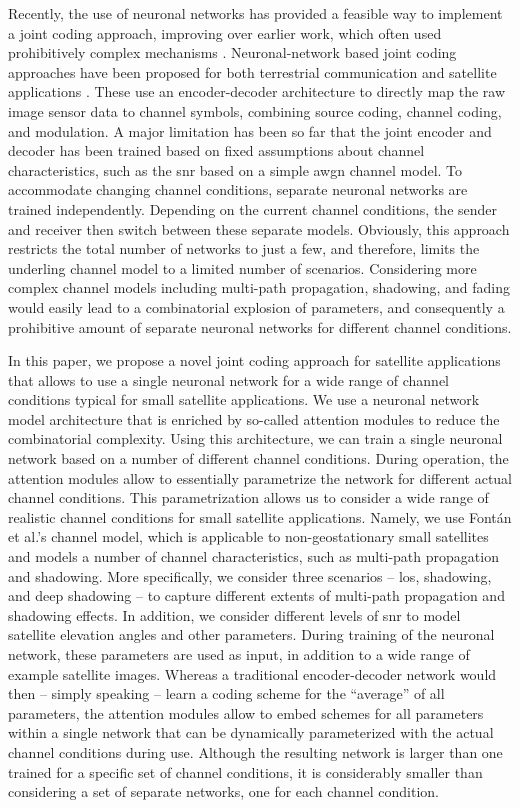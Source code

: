 \documentclass[conference]{IEEEtran}
\begin{document}
Recently, the use of neuronal networks has provided a feasible way to implement a joint coding approach, improving over earlier work, which often used prohibitively complex mechanisms \cite{9838671}.
Neuronal-network based joint coding approaches have been proposed for both terrestrial communication \cite{Bourtsoulatze2019} and satellite applications \cite{satjscc}.
These use an encoder-decoder architecture to directly map the raw image sensor data to channel symbols, combining source coding, channel coding, and modulation.
A major limitation has been so far that the joint encoder and decoder has been trained based on fixed assumptions about channel characteristics, such as the \ac{snr} based on a simple \ac{awgn} channel model.
To accommodate changing channel conditions, separate neuronal networks are trained independently.
Depending on the current channel conditions, the sender and receiver then switch between these separate models.
Obviously, this approach restricts the total number of networks to just a few, and therefore, limits the underling channel model to a limited number of scenarios.
Considering more complex channel models including multi-path propagation, shadowing, and fading would easily lead to a combinatorial explosion of parameters, and consequently a prohibitive amount of separate neuronal networks for different channel conditions.

In this paper, we propose a novel joint coding approach for satellite applications that allows to use a single neuronal network for a wide range of channel conditions typical for small satellite applications.
We use a neuronal network model architecture that is enriched by so-called attention modules to reduce the combinatorial complexity.
Using this architecture, we can train a single neuronal network based on a number of different channel conditions.
During operation, the attention modules allow to essentially parametrize the network for different actual channel conditions.
This parametrization allows us to consider a wide range of realistic channel conditions for small satellite applications.
Namely, we use Fontán et al.'s channel model, which is applicable to non-geostationary small satellites and models a number of channel characteristics, such as multi-path propagation and shadowing.
More specifically, we consider three scenarios -- \ac{los}, shadowing, and deep shadowing -- to capture different extents of multi-path propagation and shadowing effects.
In addition, we consider different levels of \ac{snr} to model satellite elevation angles and other parameters.
During training of the neuronal network, these parameters are used as input, in addition to a wide range of example satellite images.
Whereas a traditional encoder-decoder network would then -- simply speaking -- learn a coding scheme for the \enquote{average} of all parameters, the attention modules allow to embed schemes for all parameters within a single network that can be dynamically parameterized with the actual channel conditions during use.
Although the resulting network is larger than one trained for a specific set of channel conditions, it is considerably smaller than considering a set of separate networks, one for each channel condition.
\end{document}

